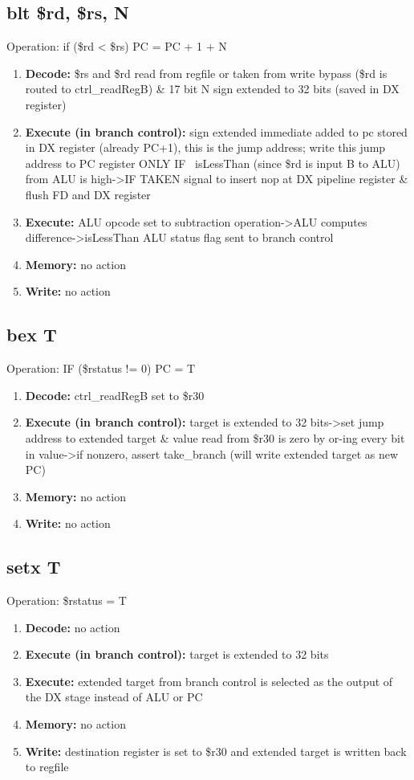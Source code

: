\documentclass[letterpaper]{article}
\begin{document}
\subsection{blt \$rd, \$rs, N }
Operation: if (\$rd < \$rs) PC = PC + 1 + N
\begin{enumerate}
    \item \textbf{Decode:} \$rs and \$rd read from regfile or taken from write bypass (\$rd is routed to ctrl\_readRegB) \& 17 bit N sign extended to 32 bits (saved in DX register)
    \item \textbf{Execute (in branch control):} sign extended immediate added to pc stored in DX register (already PC+1), this is the jump address; write this jump address to PC register ONLY IF ~isLessThan (since \$rd is input B to ALU) from ALU is high->IF TAKEN signal to insert nop at DX pipeline register \& flush FD and DX register
    \item \textbf{Execute:} ALU opcode set to subtraction operation->ALU computes difference->isLessThan ALU status flag sent to branch control
    \item \textbf{Memory:} no action
    \item \textbf{Write:} no action
\end{enumerate}

\subsection{bex T}
Operation: IF (\$rstatus != 0) PC = T
\begin{enumerate}
    \item \textbf{Decode:} ctrl\_readRegB set to \$r30
    \item \textbf{Execute (in branch control):} target is extended to 32 bits->set jump address to extended target & value read from \$r30 is zero by or-ing every bit in value->if nonzero, assert take\_branch (will write extended target as new PC)
    \item \textbf{Memory:} no action
    \item \textbf{Write:} no action
\end{enumerate}

\subsection{setx T}
Operation: \$rstatus = T
\begin{enumerate}
    \item \textbf{Decode:} no action
    \item \textbf{Execute (in branch control):} target is extended to 32 bits
     \item \textbf{Execute:} extended target from branch control is selected as the output of the DX stage instead of ALU or PC
    \item \textbf{Memory:} no action
    \item \textbf{Write:} destination register is set to \$r30 and extended target is written back to regfile
\end{enumerate}
\end{document}
